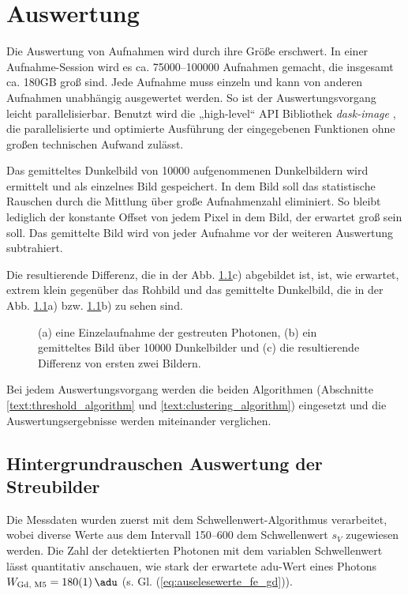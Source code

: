 \chapter{Auswertung}
\label{text:auswertung}
Die Auswertung von Aufnahmen wird durch ihre Größe erschwert. In einer Aufnahme-Session wird es ca. \numrange{75000}{100000} Aufnahmen gemacht, die insgesamt ca. 180GB groß sind. Jede Aufnahme muss einzeln und kann von anderen Aufnahmen unabhängig ausgewertet werden. So ist der Auswertungsvorgang leicht parallelisierbar. Benutzt wird die „high-level“ API Bibliothek \textit{dask-image} \cite{dask-library}, die parallelisierte und optimierte Ausführung der eingegebenen Funktionen ohne großen technischen Aufwand zulässt.

\noindent
Das gemitteltes Dunkelbild von \num{10000} aufgenommenen Dunkelbildern wird ermittelt und als einzelnes Bild gespeichert. In dem Bild soll das statistische Rauschen durch die Mittlung über große Aufnahmenzahl eliminiert. So bleibt lediglich der konstante Offset von jedem Pixel in dem Bild, der erwartet groß sein soll. Das gemittelte Bild wird von jeder Aufnahme vor der weiteren Auswertung subtrahiert.

\noindent
Die resultierende Differenz, die in der Abb. \ref{fig:capture_ped_diff}c) abgebildet ist, ist, wie erwartet, extrem klein gegenüber das Rohbild und das gemittelte Dunkelbild, die in der Abb. \ref{fig:capture_ped_diff}a) bzw. \ref{fig:capture_ped_diff}b) zu sehen sind. 
\begin{figure}[H]
    \centering
    
    \caption{(a) eine Einzelaufnahme der gestreuten Photonen, (b) ein gemitteltes Bild über \num{10000} Dunkelbilder und (c) die resultierende Differenz von ersten zwei Bildern.}
    \label{fig:capture_ped_diff}
\end{figure}

\noindent
Bei jedem Auswertungsvorgang werden die beiden Algorithmen (Abschnitte \ref{text:threshold_algorithm} und \ref{text:clustering_algorithm}) eingesetzt und die Auswertungsergebnisse werden miteinander verglichen.
\section{Hintergrundrauschen Auswertung der Streubilder}
\label{text:streuung_counting}
Die Messdaten wurden zuerst mit dem Schwellenwert-Algorithmus verarbeitet, wobei diverse Werte aus dem Intervall \SIrange{150}{600}{\adu} dem Schwellenwert $s_V$ zugewiesen werden. Die Zahl der detektierten Photonen mit dem variablen Schwellenwert lässt quantitativ anschauen, wie stark der erwartete \gls{adu}-Wert eines Photons $W_\text{Gd, M5} =  \SI{180(1)}{\adu}$ (s. Gl. (\ref{eq:auselesewerte_fe_gd})).

